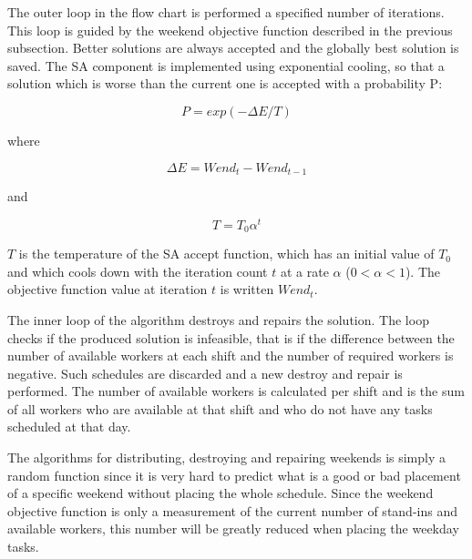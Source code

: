 The outer loop in the flow chart is performed a specified number of iterations. This loop is guided by the weekend objective function described in the previous subsection. Better solutions are always accepted and the globally best solution is saved. The SA component is implemented using exponential cooling, so that a solution which is worse than the current one is accepted with a probability P:

\begin{equation}
P = exp(-\Delta E/T)
\label{eq0}
\end{equation}

where

\begin{equation}
\Delta E = Wend_t - Wend_{t-1}
\label{eq1}
\end{equation}

and

\begin{equation}
T = T_0 \alpha^t
\label{eq2}
\end{equation}

$T$ is the temperature of the SA accept function, which has an initial value of $T_0$ and which cools down with the iteration count  $t$ at a rate $\alpha$ ($0 < \alpha < 1$). The objective function value at iteration $t$ is written $Wend_t$.


The inner loop of the algorithm destroys and repairs the solution. The loop checks if the produced solution is infeasible, that is if the difference between the number of available workers at each shift and the number of required workers is negative. Such schedules are discarded and a new destroy and repair is performed. The number of available workers is calculated per shift and is the sum of all workers who are available at that shift and who do not have any tasks scheduled at that day.

The algorithms for distributing, destroying and repairing weekends is simply a random function since it is very hard to predict what is a good or bad placement of a specific weekend without placing the whole schedule. Since the weekend objective function is only a measurement of the current number of stand-ins and available workers, this number will be greatly reduced when placing the weekday tasks. 


